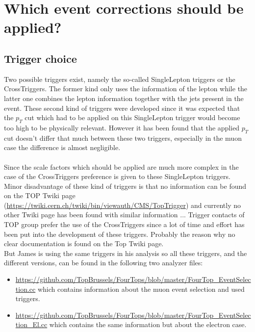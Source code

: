 
\section{Which event corrections should be applied?}

\subsection{Trigger choice}
Two possible triggers exist, namely the so-called SingleLepton triggers or the CrossTriggers. The former kind only uses the information of the lepton while the latter one combines the lepton information together with the jets present in the event. These second kind of triggers were developed since it was expected that the $p_T$ cut which had to be applied on this SingleLepton trigger would become too high to be physically relevant. However it has been found that the applied $p_T$ cut doesn't differ that much between these two triggers, especially in the muon case the difference is almost negligible.\\
\\
Since the scale factors which should be applied are much more complex in the case of the CrossTriggers preference is given to these SingleLepton triggers.\\
Minor disadvantage of these kind of triggers is that no information can be found on the TOP Twiki page (\url{https://twiki.cern.ch/twiki/bin/viewauth/CMS/TopTrigger}) and currently no other Twiki page has been found with similar information ... Trigger contacts of TOP group prefer the use of the CrossTriggers since a lot of time and effort has been put into the development of these triggers. Probably the reason why no clear documentation is found on the Top Twiki page.\\
But James is using the same triggers in his analysis so all these triggers, and the different versions, can be found in the following two analyzer files:
\begin{itemize}
 \item \url{https://github.com/TopBrussels/FourTops/blob/master/FourTop_EventSelection.cc} which contains information about the muon event selection and used triggers.
 \item \url{https://github.com/TopBrussels/FourTops/blob/master/FourTop_EventSelection_El.cc} which contains the same information but about the electron case.
\end{itemize}

